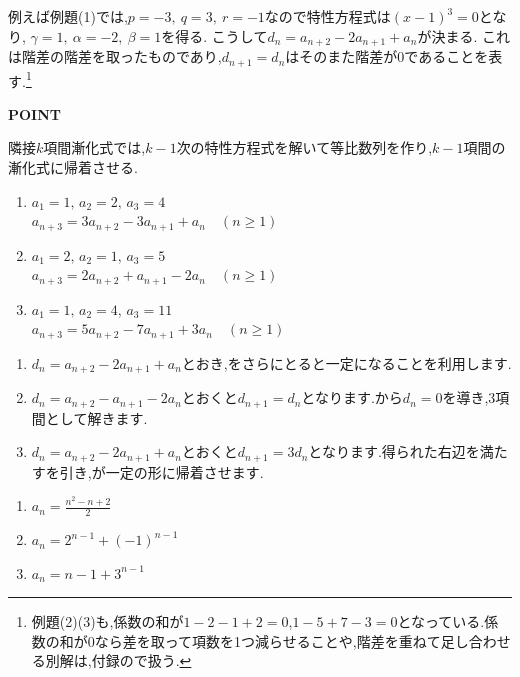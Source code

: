 例えば例題(1)では,$p=-3,\ q=3,\ r=-1$なので特性方程式は$(x-1)^3=0$となり,
$\gamma=1,\ \alpha=-2,\ \beta=1$を得る.
こうして$d_n=a_{n+2}-2a_{n+1}+a_n$が決まる.
これは階差の階差を取ったものであり,$d_{n+1}=d_n$はそのまた階差が0であることを表す.\footnote{例題(2)(3)も,係数の和が$1-2-1+2=0$,$1-5+7-3=0$となっている.係数の和が0なら差を取って項数を1つ減らせることや,階差を重ねて足し合わせる別解は,付録ので扱う.}

\begin{bookpoint}
  \textbf{POINT}\par
  隣接$k$項間漸化式では,$k-1$次の特性方程式を解いて等比数列を作り,$k-1$項間の漸化式に帰着させる.
\end{bookpoint}

\noindent {}\par\nobreak
\begin{enumerate}[label=(\arabic*),parsep=3pt,format=\bookitemlink{example-four-term-1}{problem}{answer}]
  \item $a_1=1,\,a_2=2,\,a_3=4$\\
    $a_{n+3}=3a_{n+2}-3a_{n+1}+a_n\quad(n\ge1)$
  \item $a_1=2,\,a_2=1,\,a_3=5$\\
    $a_{n+3}=2a_{n+2}+a_{n+1}-2a_n\quad(n\ge1)$
  \item $a_1=1,\,a_2=4,\,a_3=11$\\
    $a_{n+3}=5a_{n+2}-7a_{n+1}+3a_n\quad(n\ge1)$
\end{enumerate}

\noindent{}\par\nobreak
\begin{enumerate}[label=(\arabic*),parsep=3pt,format=\bookitemlink{example-four-term-1}{hint}{problem}]
  \item $d_n=a_{n+2}-2a_{n+1}+a_n$とおき,をさらにとると一定になることを利用します.
  \item $d_n=a_{n+2}-a_{n+1}-2a_n$とおくと$d_{n+1}=d_n$となります.から$d_n=0$を導き,3項間として解きます.
  \item $d_n=a_{n+2}-2a_{n+1}+a_n$とおくと$d_{n+1}=3d_n$となります.得られた右辺を満たすを引き,が一定の形に帰着させます.
\end{enumerate}

\noindent{}\par\nobreak
\begin{enumerate}[label=(\arabic*),parsep=3pt,format=\bookitemlink{example-four-term-1}{answer}{problem}]
  \item $a_n=\frac{n^2-n+2}{2}$
  \item $a_n=2^{n-1}+(-1)^{n-1}$
  \item $a_n=n-1+3^{n-1}$
\end{enumerate}

